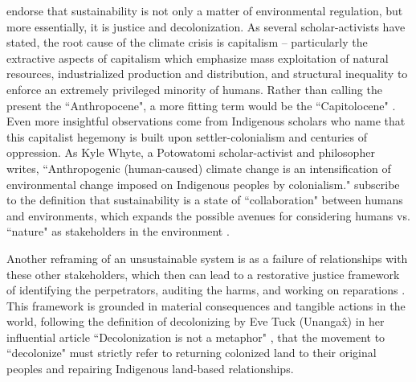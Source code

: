  endorse that sustainability is not only a matter of environmental regulation, but more essentially, it is justice and decolonization. As several scholar-activists have stated, the root cause of the climate crisis is capitalism -- particularly the extractive aspects of capitalism which emphasize mass exploitation of natural resources, industrialized production and distribution, and structural inequality to enforce an extremely privileged minority of humans. Rather than calling the present the ``Anthropocene", a more fitting term would be the ``Capitolocene" \cite{haraway_staying_2016, sze_environmental_2020}. Even more insightful observations come from Indigenous scholars who name that this capitalist hegemony is built upon settler-colonialism and centuries of oppression. As Kyle Whyte, a Potowatomi scholar-activist and philosopher writes, ``Anthropogenic (human-caused) climate change is an intensification of environmental change imposed on Indigenous peoples by colonialism." \cite{whyte_weaving_2016}  subscribe to the definition that sustainability is a state of ``collaboration" between humans and environments, which expands the possible avenues for considering  humans vs. ``nature" as stakeholders in the environment \cite{kimmerer_braiding_2015, tallbear_standing_2014}.

Another reframing of an 
unsustainable system is as a failure of relationships with these other stakeholders, which then can lead to a restorative justice framework of identifying the perpetrators, auditing the harms, and working on reparations \cite{whyte_indigenous_2017}.
This framework is grounded in material consequences and tangible actions in the world, following the definition of decolonizing by Eve Tuck (Unanga\^{x}) in her influential article ``Decolonization is not a metaphor" \cite{tuck_decolonization_2012}
, that the movement to ``decolonize"  must strictly refer to returning colonized land to their original peoples and repairing Indigenous land-based relationships.

